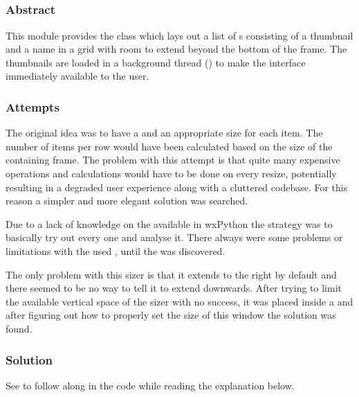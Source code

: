 \subsection{}
\label{subsec:mod:itemview}
\def\kapitelautor{Clemens Stadlbauer}

\subsubsection{Abstract}
This module provides the  class which lays out a list of
s consisting of a thumbnail and a name in a grid with room to
extend beyond the bottom of the frame. The thumbnails are loaded in a
background thread () to make the interface immediately
available to the user.

\subsubsection{Attempts}
The original idea was to have a  and an appropriate size for
each item. The number of items per row would have been calculated based on the
size of the containing frame. The problem with this attempt is that quite many
expensive operations and calculations would have to be done on every resize,
potentially resulting in a degraded user experience along with a cluttered
codebase. For this reason a simpler and more elegant solution was searched.

Due to a lack of knowledge on the available  in
wxPython the strategy was to basically try out every one and
analyse it. There always were some problems or limitations with the used
, until the  was discovered.

The only problem with this sizer is that it extends to the right by default
and there seemed to be no way to tell it to extend downwards. After trying
to limit the available vertical space of the sizer with no success, it was
placed inside a  and after figuring out how to properly
set the size of this window the solution was found.

\subsubsection{Solution} %

See  to follow along in the code while
reading the explanation below.

